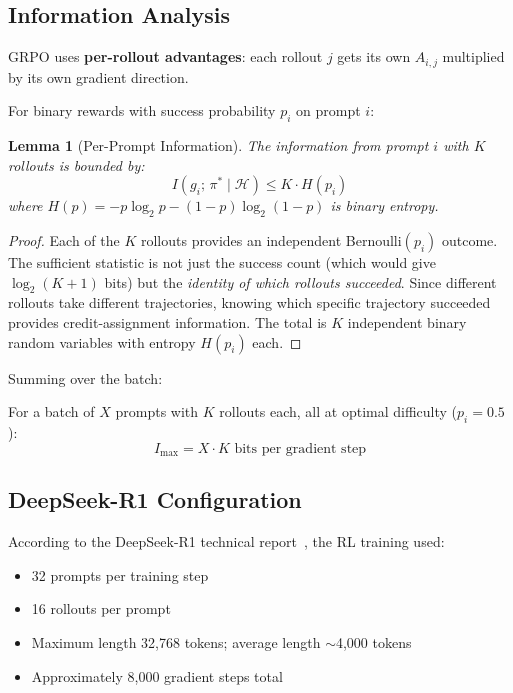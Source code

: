 \documentclass[11pt,a4paper]{article}
\newtheorem{lemma}[theorem]{Lemma}
\theoremstyle{definition}
\theoremstyle{remark}
\newcommand{\calH}{\mathcal{H}}
\begin{document}
\subsection{Information Analysis}

GRPO uses \textbf{per-rollout advantages}: each rollout $j$ gets its own $A_{i,j}$ multiplied by its own gradient direction.

For binary rewards with success probability $p_i$ on prompt $i$:

\begin{lemma}[Per-Prompt Information]
The information from prompt $i$ with $K$ rollouts is bounded by:
\[
I(g_i;\, \pi^* \mid \calH) \leq K \cdot H(p_i)
\]
where $H(p) = -p \log_2 p - (1-p) \log_2(1-p)$ is binary entropy.
\end{lemma}

\begin{proof}
Each of the $K$ rollouts provides an independent Bernoulli$(p_i)$ outcome. The sufficient statistic is not just the success count (which would give $\log_2(K+1)$ bits) but the \emph{identity of which rollouts succeeded}. Since different rollouts take different trajectories, knowing which specific trajectory succeeded provides credit-assignment information. The total is $K$ independent binary random variables with entropy $H(p_i)$ each.
\end{proof}

Summing over the batch:

\begin{keyresult}
For a batch of $X$ prompts with $K$ rollouts each, all at optimal difficulty ($p_i = 0.5$):
\[
\boxed{I_{\max} = X \cdot K \text{ bits per gradient step}}
\]
\end{keyresult}

\subsection{DeepSeek-R1 Configuration}

According to the DeepSeek-R1 technical report~\cite{deepseekr1}, the RL training used:
\begin{itemize}
    \item 32 prompts per training step
    \item 16 rollouts per prompt
    \item Maximum length 32,768 tokens; average length $\sim$4,000 tokens
    \item Approximately 8,000 gradient steps total
\end{itemize}
\end{document}
